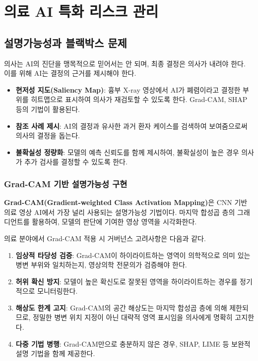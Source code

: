 \section{의료 AI 특화 리스크 관리}
\label{sec:16.2}

\subsection{설명가능성과 블랙박스 문제}
\label{sec:16.2.1}

의사는 AI의 진단을 맹목적으로 믿어서는 안 되며, 최종 결정은 의사가 내려야 한다. 이를 위해 AI는 결정의 근거를 제시해야 한다.

\begin{itemize}
 \item \textbf{현저성 지도(Saliency Map)}: 흉부 X-ray 영상에서 AI가 폐렴이라고 결정한 부위를 히트맵으로 표시하여 의사가 재검토할 수 있도록 한다. Grad-CAM, SHAP 등의 기법이 활용된다.
 \item \textbf{참조 사례 제시}: AI의 결정과 유사한 과거 환자 케이스를 검색하여 보여줌으로써 의사의 결정을 돕는다.
 \item \textbf{불확실성 정량화}: 모델의 예측 신뢰도를 함께 제시하여, 불확실성이 높은 경우 의사가 추가 검사를 결정할 수 있도록 한다.
\end{itemize}

\subsubsection{Grad-CAM 기반 설명가능성 구현}

\textbf{Grad-CAM(Gradient-weighted Class Activation Mapping)}은 CNN 기반 의료 영상 AI에서 가장 널리 사용되는 설명가능성 기법이다. 마지막 합성곱 층의 그래디언트를 활용하여, 모델의 판단에 기여한 영상 영역을 시각화한다.

의료 분야에서 Grad-CAM 적용 시 거버넌스 고려사항은 다음과 같다.

\begin{enumerate}
 \item \textbf{임상적 타당성 검증}: Grad-CAM이 하이라이트하는 영역이 의학적으로 의미 있는 병변 부위와 일치하는지, 영상의학\cite{esteva2017dermatologist} 전문의가 검증해야 한다.
 \item \textbf{허위 확신 방지}: 모델이 높은 확신도로 잘못된 영역을 하이라이트하는 경우를 정기적으로 모니터링한다.
 \item \textbf{해상도 한계 고지}: Grad-CAM의 공간 해상도는 마지막 합성곱 층에 의해 제한되므로, 정밀한 병변 위치 지정이 아닌 대략적 영역 표시임을 의사에게 명확히 고지한다.
 \item \textbf{다중 기법 병행}: Grad-CAM만으로 충분하지 않은 경우, SHAP, LIME 등 보완적 설명 기법을 함께 제공한다.
\end{enumerate}

